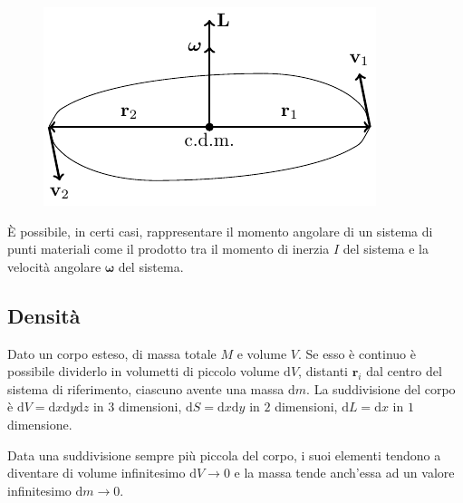 \documentclass{article}
\newcommand{\vect}[1]{\boldsymbol{\mathbf{#1}}}
\newcommand{\df}{\mathrm{d}}
\numberwithin{equation}{subsection}
\begin{document}
\begin{figure}[H]%
    \centering
    \includegraphics{inerzia.pdf}%
\end{figure}

\`{E} possibile, in certi casi, rappresentare il momento angolare di un sistema di punti materiali 
come il prodotto tra il momento di inerzia $I$ del sistema e la velocità angolare $\vect\omega$ del sistema. 

\subsection{Densità}

Dato un corpo esteso, di massa totale $M$ e volume $V$. Se esso è continuo è possibile dividerlo 
in volumetti di piccolo volume $\df V$, distanti $\vect{r}_i$ dal centro del sistema di 
riferimento, ciascuno avente una massa $\df m$. La suddivisione del corpo è 
$\df V=\df x\df y\df z$ in $3$ dimensioni, $\df S=\df x\df y$ in $2$ dimensioni, 
$\df L=\df x$ in $1$ dimensione. 

Data una suddivisione sempre più piccola del corpo, i suoi elementi tendono a diventare di volume infinitesimo $\df V\to 0$ e 
la massa tende anch'essa ad un valore infinitesimo $\df m\to 0$.
\end{document}
